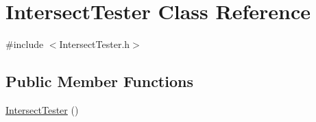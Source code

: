 \hypertarget{class_intersect_tester}{}\section{Intersect\+Tester Class Reference}
\label{class_intersect_tester}


{\ttfamily \#include $<$Intersect\+Tester.\+h$>$}

\subsection*{Public Member Functions}
\begin{DoxyCompactItemize}
\item 
\hyperlink{class_intersect_tester_a2c6c76bd440dde9b8d158b4c37b174f8}{Intersect\+Tester} ()
\end{DoxyCompactItemize}

